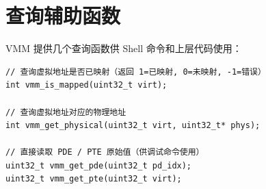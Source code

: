 \section{查询辅助函数}

VMM 提供几个查询函数供 Shell 命令和上层代码使用：

\begin{lstlisting}[style=cstyle]
// 查询虚拟地址是否已映射（返回 1=已映射, 0=未映射, -1=错误）
int vmm_is_mapped(uint32_t virt);

// 查询虚拟地址对应的物理地址
int vmm_get_physical(uint32_t virt, uint32_t* phys);

// 直接读取 PDE / PTE 原始值（供调试命令使用）
uint32_t vmm_get_pde(uint32_t pd_idx);
uint32_t vmm_get_pte(uint32_t virt);
\end{lstlisting}



